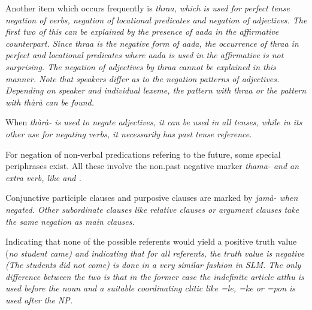 Another item which occurs frequently is \em thraa\em, which is used for perfect tense negation of verbs, negation of locational predicates and negation of adjectives. The first two of this can be explained by the presence of \em aada \em in the affirmative counterpart. Since \em thraa \em is the negative form of \em aada\em, the occurrence of \em thraa \em in perfect and locational predicates where \em aada \em is used in the affirmative is not surprising. The negation of adjectives by \em thraa \em cannot be explained in this manner. Note that speakers differ as to the negation patterns of adjectives. Depending on speaker and individual lexeme, the pattern with \em thraa \em or the pattern with \em thàrà \em can be found.

When \em thàrà- \em is used to negate adjectives, it can be used in all tenses, while in its other use for negating verbs, it necessarily has past tense reference.

For negation of non-verbal predications refering to the future, some special periphrases exist. All these involve the non.past negative marker \em thama- \em and an extra verb, like  and .

Conjunctive participle clauses and purposive clauses are marked by \em jamà- \em when negated. Other subordinate clauses like relative clauses or argument clauses take the same negation as main clauses.

Indicating that none of the possible referents would yield a positive truth value (\em no student came\em) and indicating that for all referents, the truth value is negative (\em The students did not come\em) is done in a very similar fashion in SLM. The only difference between the two is that in the former case the indefinite article \em atthu \em is used before  the noun and a suitable coordinating clitic like \em =le\em, \em =ke \em or \em =pon \em is used after the NP.

 \\



